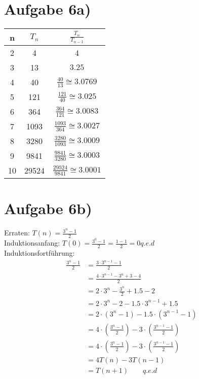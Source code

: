 \documentclass[a4paper,10pt,freqn]{article}
\begin{document}
\section{Aufgabe 6a)}
\renewcommand{\arraystretch}{1.3} 
\begin{tabular}{ccc}
 \toprule
 n&$T_n$&$\frac{T_n}{T_{n-1}}$\\
 \midrule
 2&4&4\\
 3&13&$3.25$\\
 4&40&$\frac{40}{13}\cong3.0769$\\
 5&121&$\frac{121}{40}\cong3.025$\\
 6&364&$\frac{364}{121}\cong3.0083$\\
 7&1093&$\frac{1093}{364}\cong3.0027$\\
 8&3280&$\frac{3280}{1093}\cong3.0009$\\
 9&9841&$\frac{9841}{3280}\cong3.0003$\\
 10&29524&$\frac{29524}{9841}\cong3.0001$\\
 \bottomrule
\end{tabular}
\section{Aufgabe 6b)}
Erraten: $T(n)=\frac{3^n-1}{2}$\\
Induktionsanfang: $T(0) = \frac{3^0-1}{2} = \frac{1-1}{2} = 0 q.e.d$\\
Induktionsfortführung:
\begin{align*}
 \frac{3^n-1}{2} &= \frac{3\cdot3^{n-1}-1}{2}\\
 &= \frac{4\cdot3^{n-1}-3^n+3-4}{2}\\
 &= 2\cdot3^n-\frac{3^n}{2}+1.5-2\\
 &= 2\cdot3^n-2-1.5\cdot3^{n-1}+1.5\\
 &= 2\cdot(3^n-1)-1.5\cdot(3^{n-1}-1)\\
 &= 4\cdot(\frac{3^n-1}{2})-3\cdot(\frac{3^{n-1}-1}{2})\\
 &= 4\cdot(\frac{3^n-1}{2})-3\cdot(\frac{3^{n-1}-1}{2})\\
 &= 4T(n)-3T(n-1)\\
 &= T(n+1)\qquad q.e.d
\end{align*}
\end{document}
